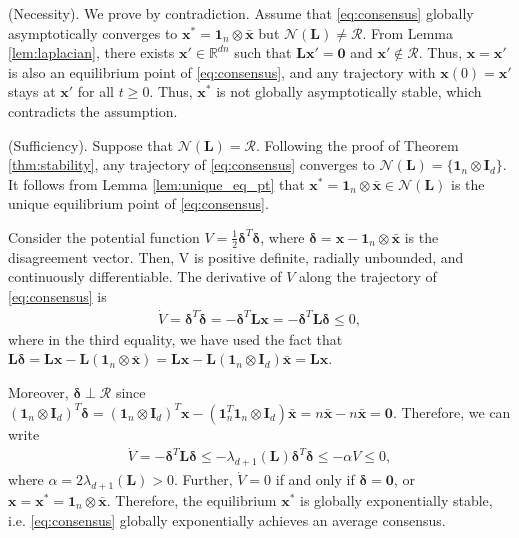 \documentclass[draftclsnofoot,11pt,onecolumn]{IEEEtran}
\newcommand{\m}[1]{\mathbf{#1}}
\newcommand{\mc}[1]{\mathcal{#1}}
\newcommand{\mb}[1]{\mathbb{#1}}
\begin{document}
\begin{IEEEproof}(Necessity). We prove by contradiction. Assume that \eqref{eq:consensus} globally asymptotically converges to $\m{x}^*=\m{1}_n \otimes \bar{\m{x}}$ but $\mc{N}(\m{L}) \neq \mc{R}$. From Lemma \ref{lem:laplacian}, there exists $\m{x}' \in \mb{R}^{dn}$ such that $\m{L}\m{x}'=\m{0}$ and $\m{x}' \notin \mc{R}$. Thus, $\m{x} = \m{x}'$ is also an equilibrium point of \eqref{eq:consensus}, and any trajectory with $\m{x}(0) = \m{x}'$ stays at $\m{x}'$ for all $t \geq 0$. Thus, $\m{x}^*$ is not globally asymptotically stable, which contradicts the assumption.

(Sufficiency). Suppose that $\mc{N}(\m{L}) = \mc{R}$. Following the proof of Theorem \ref{thm:stability}, any trajectory of \eqref{eq:consensus} converges to $\mc{N}(\m{L}) = \{ \m{1}_n \otimes \m{I}_{d} \}$. It follows from Lemma \ref{lem:unique_eq_pt} that $\m{x}^* = \m{1}_n \otimes \bar{\m{x}} \in \mc{N}(\m{L})$ is the unique equilibrium point of \eqref{eq:consensus}. %

Consider the potential function $V = \frac{1}{2} \bm{\delta}^T\bm{\delta}$, where $\bm{\delta} = \m{x} - \m{1}_n \otimes \bar{\m{x}}$ is the disagreement vector. Then, V is positive definite, radially unbounded, and continuously differentiable. The derivative of $V$ along the trajectory of \eqref{eq:consensus} is
\begin{align} \label{eq:dot_V1}
\dot{V} =\bm{\delta}^T \dot{\bm{\delta}} = - \bm{\delta}^T\m{L} \m{x} = -\bm{\delta}^T \m{L} \bm{\delta} \leq 0,
\end{align}
where in the third equality, we have used the fact that
$\m{L} \bm{\delta} = \m{L} \m{x} - \m{L} (\m{1}_n \otimes \bar{\m{x}}) = \m{L} \m{x} - \m{L} (\m{1}_n \otimes \m{I}_{d}) \bar{\m{x}} = \m{L} \m{x}$. 
%

Moreover, $\bm{\delta} \perp \mc{R}$ since $(\m{1}_n \otimes \m{I}_{d})^T \bm{\delta} = (\m{1}_n \otimes \m{I}_{d})^T \m{x} - (\m{1}_n^T\m{1}_n \otimes \m{I}_{d}) \bar{\m{x}} = n \bar{\m{x}} - n \bar{\m{x}} = \m{0}$. Therefore, we can write 
\begin{align}\label{eq:convergence_rate}
\dot{V} = -\bm{\delta}^T \m{L} \bm{\delta}  \leq - \lambda_{d+1}(\m{L}) \bm{\delta}^T\bm{\delta} \leq -\alpha V \leq 0,
\end{align}
where $\alpha = 2 \lambda_{d+1}(\m{L}) > 0$. Further, $\dot{V} = 0$ if and only if $\bm{\delta} = \m{0}$, or $\m{x} = \m{x}^*= \m{1}_n \otimes \bar{\m{x}}$. Therefore, the equilibrium $\m{x}^*$ is globally exponentially stable, i.e. \eqref{eq:consensus} globally exponentially achieves an average consensus.
\end{IEEEproof}
\end{document}
